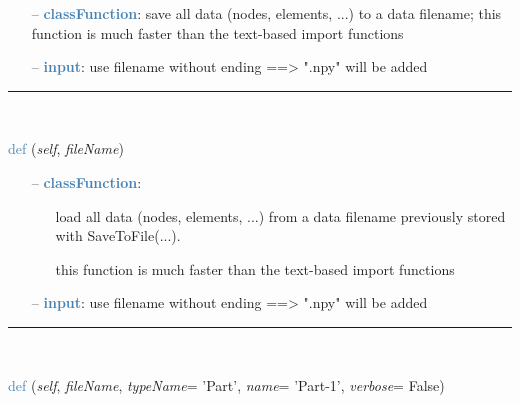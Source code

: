 \begin{itemize}[leftmargin=1.4cm]
\begin{itemize}[leftmargin=0.5cm]
\begin{itemize}[leftmargin=1.4cm]
\begin{itemize}[leftmargin=1.4cm]
\begin{itemize}[leftmargin=0.5cm]
\begin{flushleft}
\end{flushleft}
\setlength{\itemindent}{0.7cm}
\begin{itemize}[leftmargin=0.7cm]
  \item[--]  \textcolor{steelblue}{\bf classFunction}: save all data (nodes, elements, ...) to a data filename; this function is much faster than the text-based import functions  \item[--]  \textcolor{steelblue}{\bf input}: use filename without ending ==> ".npy" will be added\vspace{12pt}\end{itemize}
%
\noindent\rule{8cm}{0.75pt}\vspace{1pt} \\ 
\begin{flushleft}
\noindent \textcolor{steelblue}{def {\bf {}}}\label{sec:FEM:FEMinterface:LoadFromFile}
({\it self}, {\it fileName})
\end{flushleft}
\setlength{\itemindent}{0.7cm}
\begin{itemize}[leftmargin=0.7cm]
  \item[--]  \textcolor{steelblue}{\bf classFunction}: \vspace{-6pt}
  \begin{itemize}[leftmargin=1.2cm]
\setlength{\itemindent}{-0.7cm}
    \item[] load all data (nodes, elements, ...) from a data filename previously stored with SaveToFile(...).
    \item[] this function is much faster than the text-based import functions
  \end{itemize}
  \item[--]  \textcolor{steelblue}{\bf input}: use filename without ending ==> ".npy" will be added\vspace{12pt}\end{itemize}
%
\noindent\rule{8cm}{0.75pt}\vspace{1pt} \\ 
\begin{flushleft}
\noindent \textcolor{steelblue}{def {\bf {}}}\label{sec:FEM:FEMinterface:ImportFromAbaqusInputFile}
({\it self}, {\it fileName}, {\it typeName}= 'Part', {\it name}= 'Part-1', {\it verbose}= False)
\end{flushleft}
\setlength{\itemindent}{0.7cm}

\end{itemize}
\end{itemize}
\end{itemize}
\end{itemize}
\end{itemize}
